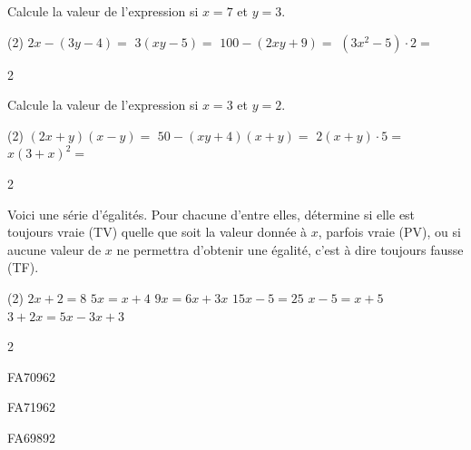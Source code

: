 \documentclass[a4paper,11pt]{report}
\begin{document}
\begin{exo}
{Calcule la valeur de l'expression si $x=7$ et $y=3$.
\begin{tasks}(2)
    \task $2x-(3y-4)=$
     \task $3(xy-5)=$
     \task $100-(2xy+9)=$
     \task $(3x^2-5)\cdot2=$
\end{tasks}
}
{2}
\end{exo}

\begin{exo}
{Calcule la valeur de l'expression si $x=3$ et $y=2$.
\begin{tasks}(2)
    \task $(2x+y)(x-y)=$
     \task $50-(xy+4)(x+y)=$
     \task $2(x+y)\cdot5=$
     \task $x(3+x)^2=$
\end{tasks}
}
{2}
\end{exo}


\begin{exo}
{Voici une série d'égalités. Pour chacune d'entre elles, détermine si elle est toujours vraie (TV) quelle que soit la valeur donnée à $x$, parfois vraie (PV), ou si aucune valeur de $x$ ne permettra d'obtenir une égalité, c'est à dire toujours fausse (TF).
\begin{tasks}(2)
    \task $2x+2=8$
     \task $5x=x+4$
     \task $9x=6x+3x$
     \task $15x-5=25$
     \task $x-5=x+5$
     \task $3+2x=5x-3x+3$
\end{tasks}
}
{2}
\end{exo}

\begin{exof}{FA70}{96}{2}
\end{exof}

\begin{exof}{FA71}{96}{2}
\end{exof}

\begin{exol}{FA69}{89}{2}
\end{exol}

\end{document}
